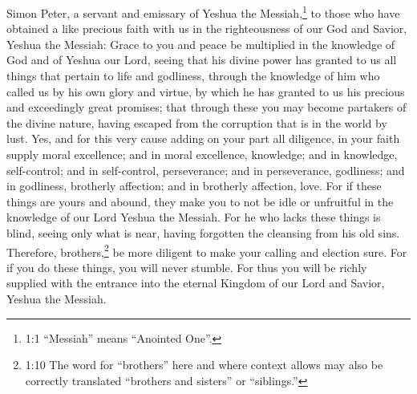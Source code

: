 \newpage
\null
\thispagestyle{empty}
\newpage


 



\vspace{-1.36in}


\mychapter{} \myverse*{}Simon Peter, a servant and emissary of Yeshua the Messiah,\footnote{1:1 “Messiah” means “Anointed One”.} to those who have obtained a like precious faith with
us in the righteousness of our God and Savior, Yeshua the Messiah:
\myverse{}Grace to you and peace be multiplied in the knowledge of God and of Yeshua our
Lord,
\myverse{}seeing that his divine power has granted to us all things that pertain to life
and godliness, through the knowledge of him who called us by his own glory and virtue,
\myverse{}by which he has granted to us his precious and exceedingly great promises; that
through these you may become partakers of the divine nature, having escaped from the corruption that is
in the world by lust.
\myverse{}Yes, and for this very cause adding on your part all diligence, in your faith
supply moral excellence; and in moral excellence, knowledge;
\myverse{}and in knowledge, self-control; and in self-control, perseverance; and in perseverance,
godliness;
\myverse{}and in godliness, brotherly affection; and in brotherly affection, love.
\myverse{}For if these things are yours and abound, they make you to not be idle or unfruitful
in the knowledge of our Lord Yeshua the Messiah.
\myverse{}For he who lacks these things is blind, seeing only what is near, having forgotten
the cleansing from his old sins.
\myverse{}Therefore, brothers,\footnote{1:10 The word for “brothers” here and where context allows may also be correctly translated “brothers
	and sisters” or “siblings.”
} be more diligent to make your calling and election sure. For if you do these things, you will
never stumble.
\myverse{}For thus you will be richly supplied with the entrance into the eternal Kingdom
of our Lord and Savior, Yeshua the Messiah.

